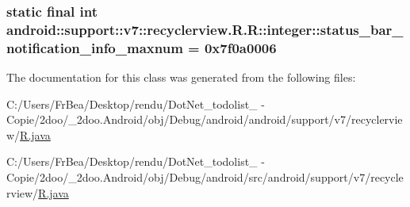 \hypertarget{classandroid_1_1support_1_1v7_1_1recyclerview_1_1_r_1_1integer_7cfd73f037acc977ce4c5ec9282a34bb}{
\subsubsection[{status\_\-bar\_\-notification\_\-info\_\-maxnum}]{\setlength{\rightskip}{0pt plus 5cm}static final int android::support::v7::recyclerview.R.R::integer::status\_\-bar\_\-notification\_\-info\_\-maxnum = 0x7f0a0006}}
\label{classandroid_1_1support_1_1v7_1_1recyclerview_1_1_r_1_1integer_7cfd73f037acc977ce4c5ec9282a34bb}




The documentation for this class was generated from the following files:\begin{CompactItemize}
\item 
C:/Users/FrBea/Desktop/rendu/DotNet\_\-todolist\_ - Copie/2doo/\_\-2doo.Android/obj/Debug/android/android/support/v7/recyclerview/\hyperlink{android_2support_2v7_2recyclerview_2_r_8java}{R.java}\item 
C:/Users/FrBea/Desktop/rendu/DotNet\_\-todolist\_ - Copie/2doo/\_\-2doo.Android/obj/Debug/android/src/android/support/v7/recyclerview/\hyperlink{src_2android_2support_2v7_2recyclerview_2_r_8java}{R.java}\end{CompactItemize}
